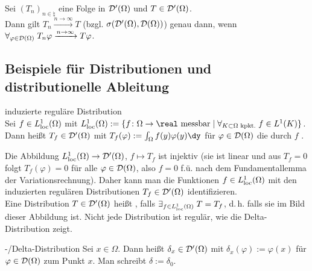 \begin{Bem}
    Sei $(T_n)_{n \in \natural}$ eine Folge in $\mathcal{D}'(\Omega)$ und $T \in \mathcal{D}'(\Omega)$.\\
    Dann gilt $T_n \xrightarrow{n \to \infty} T$ (bzgl. $\sigma(\mathcal{D}'(\Omega), \mathcal{D}(\Omega))$)
    genau dann, wenn $\forall_{\varphi \in \mathcal{D}(\Omega)}\;
    T_n \varphi \xrightarrow{n \to \infty} T \varphi$.
\end{Bem}

\pagebreak

\subsection{%
    Beispiele für Distributionen und distributionelle Ableitung%
}

\begin{Def}{induzierte reguläre Distribution}\\
    Sei $f \in L^1_{\text{loc}}(\Omega)$
    mit $L^1_\loc(\Omega) := \{f\colon \Omega \rightarrow \real \text{ messbar} \;|\;
    \forall_{K \subset \Omega \text{ kpkt.}}\; f \in L^1(K)\}$.\\
    Dann heißt $T_f \in \mathcal{D}'(\Omega)$ mit $T_f(\varphi) := \int_\Omega f(y)\varphi(y)\dy$
    für $\varphi \in \mathcal{D}(\Omega)$
    die durch $f$ .
\end{Def}

\begin{Bem}
    Die Abbildung $L^1_{\text{loc}}(\Omega) \rightarrow \mathcal{D}'(\Omega)$, $f \mapsto T_f$ ist injektiv
    (sie ist linear und aus $T_f = 0$ folgt $T_f(\varphi) = 0$ für alle $\varphi \in \mathcal{D}(\Omega)$,
    also $f = 0$ f.ü. nach dem Fundamentallemma der Variationsrechnung).
    Daher kann man die Funktionen $f \in L^1_{\text{loc}}(\Omega)$ mit den
    induzierten regulären Distributionen $T_f \in \mathcal{D}'(\Omega)$ identifizieren.\\
    Eine Distribution $T \in \mathcal{D}'(\Omega)$ heißt ,
    falls $\exists_{f \in L^1_{\text{loc}}(\Omega)}\; T = T_f$,
    d.\,h. falls sie im Bild dieser Abbildung ist.
    Nicht jede Distribution ist regulär, wie die Delta-Distribution zeigt.
\end{Bem}

\begin{Def}{-/Delta-Distribution}
    Sei $x \in \Omega$.
    Dann heißt $\delta_x \in \mathcal{D}'(\Omega)$ mit $\delta_x(\varphi) := \varphi(x)$ für
    $\varphi \in \mathcal{D}(\Omega)$  zum Punkt $x$.
    Man schreibt $\delta := \delta_0$.
\end{Def}

